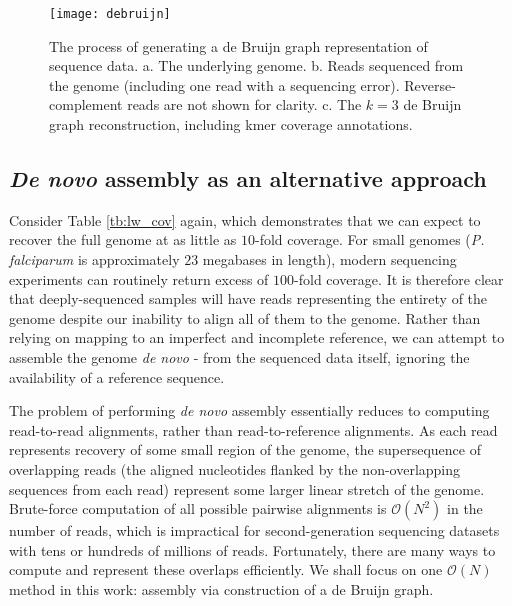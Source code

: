\begin{figure}[h!]
  \centering
    \texttt{[image: debruijn]}
  \caption{The process of generating a de Bruijn graph representation of sequence data.  a. The underlying genome. b. Reads sequenced from the genome (including one read with a sequencing error).  Reverse-complement reads are not shown for clarity.  c. The $k=3$ de Bruijn graph reconstruction, including kmer coverage annotations.}
  \label{fig:debruijn}
\end{figure}

\subsection{\textit{De novo} assembly as an alternative approach}

Consider Table \ref{tb:lw_cov} again, which demonstrates that we can expect to recover the full genome at as little as $10$-fold coverage.  For small genomes (\textit{P. falciparum} is approximately $23$ megabases in length), modern sequencing experiments can routinely return excess of $100$-fold coverage.  It is therefore clear that deeply-sequenced samples will have reads representing the entirety of the genome despite our inability to align all of them to the genome.  Rather than relying on mapping to an imperfect and incomplete reference, we can attempt to assemble the genome \textit{de novo} - from the sequenced data itself, ignoring the availability of a reference sequence.

The problem of performing \textit{de novo} assembly essentially reduces to computing read-to-read alignments, rather than read-to-reference alignments.  As each read represents recovery of some small region of the genome, the supersequence of overlapping reads (the aligned nucleotides flanked by the non-overlapping sequences from each read) represent some larger linear stretch of the genome.  Brute-force computation of all possible pairwise alignments is $\mathcal{O}(N^2)$ in the number of reads, which is impractical for second-generation sequencing datasets with tens or hundreds of millions of reads.  Fortunately, there are many ways to compute and represent these overlaps efficiently.  We shall focus on one $\mathcal{O}(N)$ method in this work: assembly via construction of a de Bruijn graph.

